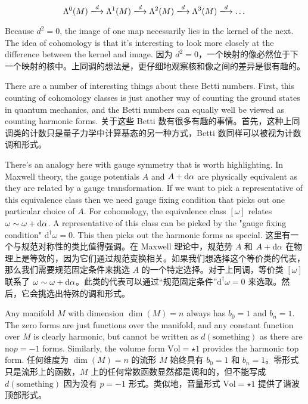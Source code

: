 \documentclass{article}
\begin{document}
\[ \Lambda^0(M) \xlongrightarrow{d} \Lambda^1(M) \xlongrightarrow{d} \Lambda^2(M) \xlongrightarrow{d} \Lambda^3(M) \xlongrightarrow{d} \dots \]

\begin{paracol}{2}

Because $d^2 = 0$, the image of one map necessarily lies in the kernel of the next. The idea of cohomology is that it’s interesting to look more closely at the diﬀerence between the kernel and image.
\switchcolumn
因为 $d^2 = 0$，一个映射的像必然位于下一个映射的核中。上同调的想法是，更仔细地观察核和像之间的差异是很有趣的。
\switchcolumn*

There are a number of interesting things about these Betti numbers. First, this counting of cohomology classes is just another way of counting the ground states in quantum mechanics, and the Betti numbers can equally well be viewed as counting harmonic forms.
\switchcolumn
关于这些 Betti 数有很多有趣的事情。首先，这种上同调类的计数只是量子力学中计算基态的另一种方式，Betti 数同样可以被视为计数调和形式。
\switchcolumn*

There’s an analogy here with gauge symmetry that is worth highlighting. In Maxwell theory, the gauge potentials $A$ and $A + \odif{\alpha}$ are physically equivalent as they are related by a gauge transformation. If we want to pick a representative of this equivalence class then we need gauge ﬁxing condition that picks out one particular choice of $A$. For cohomology, the equivalence class $[\omega]$ relates $\omega \sim \omega + \odif{\alpha}$. A representative of this class can be picked by the "gauge ﬁxing condition" $\mathrm{d}^{\dagger} \omega = 0$. This then picks out the harmonic forms as special.
\switchcolumn
这里有一个与规范对称性的类比值得强调。在 Maxwell 理论中，规范势 $A$ 和 $A + \odif{\alpha}$ 在物理上是等效的，因为它们通过规范变换相关。如果我们想选择这个等价类的代表，那么我们需要规范固定条件来挑选 $A$ 的一个特定选择。对于上同调，等价类 $[\omega]$ 联系了 $\omega \sim \omega + \odif{\alpha}$。此类的代表可以通过“规范固定条件”$\mathrm{d}^{\dagger} \omega = 0$ 来选取。然后，它会挑选出特殊的调和形式。
\switchcolumn*

Any manifold $M$ with dimension $\dim(M) = n$ always has $b_0 = 1$ and $b_n = 1$. The zero forms are just functions over the manifold, and any constant function over $M$ is clearly harmonic, but cannot be written as $d(\text{something})$ as there are no$p = - 1$ forms. Similarly, the volume form $\text{Vol} = \star 1$ provides the harmonic top form.
\switchcolumn
任何维度为 $\dim(M) = n$ 的流形 $M$ 始终具有 $b_0 = 1$ 和 $b_n = 1$。零形式只是流形上的函数，$M$ 上的任何常数函数显然都是调和的，但不能写成 $d(\text{something})$ 因为没有 $p = - 1$ 形式。类似地，音量形式 $\text{Vol} = \star 1$ 提供了谐波顶部形式。
\switchcolumn*


\end{paracol}
\end{document}
